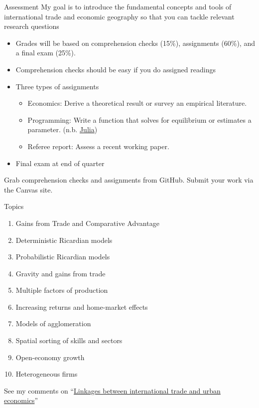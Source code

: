\documentclass[10pt,notes=hide]{beamer}
\begin{document}
\begin{frame}{Assessment}
My goal is to introduce the fundamental concepts and tools of international trade and economic geography so that you can tackle relevant research questions
\begin{itemize}
\item Grades will be based on comprehension checks (15\%), assignments (60\%), and a final exam (25\%).
\item Comprehension checks should be easy if you do assigned readings
\item Three types of assignments
\begin{itemize}
\item Economics: Derive a theoretical result or survey an empirical literature.
\item Programming: Write a function that solves for equilibrium or estimates a parameter. (n.b. \href{https://tradediversion.net/2018/09/17/why-i-encourage-econ-phd-students-to-learn-julia/}{Julia})
\item Referee report: Assess a recent working paper.
\end{itemize}
\item Final exam at end of quarter
\end{itemize}
Grab comprehension checks and assignments from GitHub.
Submit your work via the Canvas site.
\end{frame}
\begin{frame}{Topics}
\begin{enumerate}
\item Gains from Trade and Comparative Advantage
\item Deterministic Ricardian models
\item Probabilistic Ricardian models
\item Gravity and gains from trade
\item Multiple factors of production
\item Increasing returns and home-market effects
\item Models of agglomeration
\item Spatial sorting of skills and sectors
\item Open-economy growth
\item Heterogeneous firms
\end{enumerate}
See my comments on ``\href{https://tradediversion.net/2017/09/17/linkages-between-international-trade-and-urban-economics/}{Linkages between international trade and urban economics}''
\end{frame}
\end{document}

